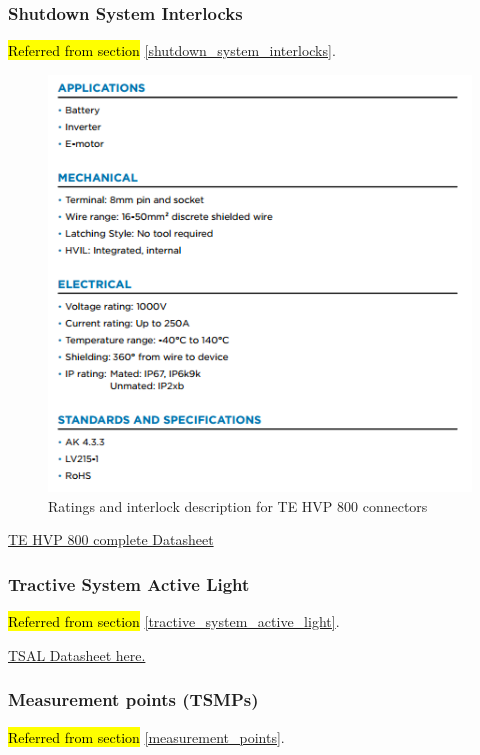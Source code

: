 \documentclass{article}
\DeclareRobustCommand{\hlr}[1]{{\sethlcolor{pink}\hl{#1}}}
\begin{document}
\setcounter{subsubsection}{5}
\subsubsection{Shutdown System Interlocks}\label{sec:appendix_interlocks}
\hlr{Referred from section} \ref{shutdown_system_interlocks}.

\begin{figure}[H]
	\includegraphics[width=.7 \linewidth]{HVP_800_ratings.png}
	\caption{Ratings and interlock description for TE HVP 800 connectors}
	\label{fig:hvp_800_ratings}
\end{figure}
\href{http://www.te.com/content/dam/te-com/documents/hybrid-and-electric-mobility-solutions/global/8-1773462-1-hvp-800.pdf}{TE HVP 800 complete Datasheet}

\hypertarget{TSALdatasheet}{}
\subsubsection{Tractive System Active Light}
\hlr{Referred from section }\ref{tractive_system_active_light}.

\href{https://d114hh0cykhyb0.cloudfront.net/pdfs/MSTRB-X-X+Mini+Strobe+LED.pdf}{TSAL Datasheet here.}

\subsubsection{Measurement points (TSMPs)}\label{sec:appendix_TSMP}
\hlr{Referred from section }\ref{measurement_points}.
\end{document}
